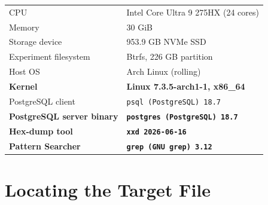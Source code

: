 \documentclass[10pt,a4paper]{article}
\begin{document}
\begin{table}[h]
    \centering
    \small
    \begin{tabular}{@{}ll@{}}
        \toprule
        CPU                               & Intel Core Ultra 9 275HX (24 cores)                  \\
        Memory                            & 30 GiB                                               \\
        Storage device                    & 953.9 GB NVMe SSD                                    \\
        Experiment filesystem             & Btrfs, 226 GB partition                              \\
        Host OS                           & Arch Linux (rolling)                                 \\
        \textbf{Kernel}                   & \large\textbf{Linux 7.3.5-arch1-1, x86\_64}          \\
        PostgreSQL client                 & \texttt{psql (PostgreSQL) 18.7}                      \\
        \textbf{PostgreSQL server binary} & {\large\textbf{\texttt{postgres (PostgreSQL) 18.7}}} \\
        \textbf{Hex-dump tool}            & \large\textbf{\texttt{xxd 2026-06-16}}               \\
        \textbf{Pattern Searcher}         & \large\textbf{\texttt{grep (GNU grep) 3.12}}         \\
        \bottomrule
    \end{tabular}
\end{table}

\section{Locating the Target File}
\end{document}
